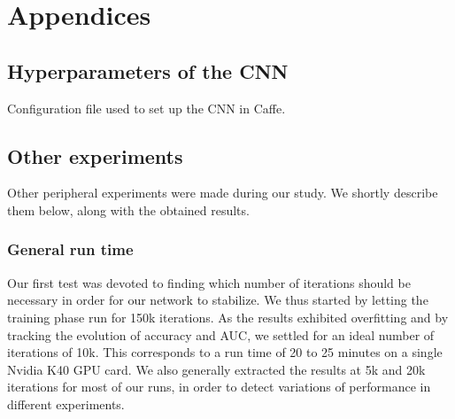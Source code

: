 \documentclass[a4paper]{article}
\begin{document}
\section{Appendices}
\subsection{Hyperparameters of the CNN}{\label{cnn_param}}
Configuration file used to set up the CNN in Caffe.
\begingroup
\obeylines

\endgroup

\subsection{Other experiments}
 Other peripheral experiments were made during our study. We shortly describe them below, along with the obtained results.
        \subsubsection{General run time}
            Our first test was devoted to finding which number of iterations should be necessary in order for our network to stabilize. We thus started by letting the training phase run for 150k iterations. As the results exhibited overfitting and by tracking the evolution of accuracy and AUC, we settled for an ideal number of iterations of 10k. This corresponds to a run time of 20 to 25 minutes on a single Nvidia K40 GPU card. We also generally extracted the results at 5k and 20k iterations for most of our runs, in order to detect variations of performance in different experiments.
\end{document}

